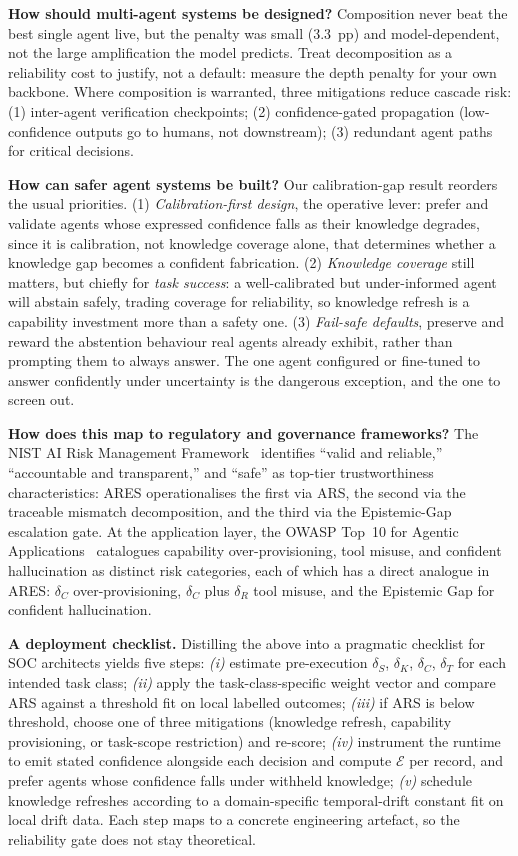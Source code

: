 \documentclass[journal,compsoc]{IEEEtran}
\newcommand{\ARES}{\textsc{ARES}}
\begin{document}
\textbf{How should multi-agent systems be designed?}
Composition never beat the best single agent live, but the penalty was
small ($3.3$~pp) and model-dependent, not the large amplification the
model predicts. Treat decomposition as a reliability cost to justify,
not a default: measure the depth penalty for your own backbone. Where
composition is warranted, three mitigations reduce cascade risk: (1)
inter-agent verification checkpoints; (2) confidence-gated propagation
(low-confidence outputs go to humans, not downstream); (3) redundant
agent paths for critical decisions.

\textbf{How can safer agent systems be built?}
Our calibration-gap result reorders the usual priorities. (1)
\textit{Calibration-first design}, the operative lever: prefer and
validate agents whose expressed confidence falls as their knowledge
degrades, since it is calibration, not knowledge coverage alone, that
determines whether a knowledge gap becomes a confident fabrication.
(2) \textit{Knowledge coverage} still matters, but chiefly for
\textit{task success}: a well-calibrated but under-informed agent will
abstain safely, trading coverage for reliability, so knowledge refresh
is a capability investment more than a safety one. (3) \textit{Fail-safe
defaults}, preserve and reward the abstention behaviour real agents
already exhibit, rather than prompting them to always answer. The one
agent configured or fine-tuned to answer confidently under uncertainty
is the dangerous exception, and the one to screen out.

\textbf{How does this map to regulatory and governance frameworks?}
The NIST AI Risk Management
Framework~\cite{nist_ai_rmf} identifies ``valid and reliable,''
``accountable and transparent,'' and ``safe'' as top-tier
trustworthiness characteristics: \ARES{} operationalises the first
via ARS, the second via the traceable mismatch decomposition, and
the third via the Epistemic-Gap escalation gate. At the application layer,
the OWASP Top~10 for Agentic
Applications~\cite{owasp2026agentic} catalogues capability
over-provisioning, tool misuse, and confident hallucination as
distinct risk categories, each of which has a direct analogue in
\ARES{}: $\delta_C$ over-provisioning, $\delta_C$ plus $\delta_R$
tool misuse, and the Epistemic Gap for confident hallucination.

\textbf{A deployment checklist.}
Distilling the above into a pragmatic checklist for SOC
architects yields five steps: \textit{(i)} estimate pre-execution
$\delta_S$, $\delta_K$, $\delta_C$, $\delta_T$ for each intended
task class; \textit{(ii)} apply the task-class-specific weight
vector and compare ARS against a threshold fit on local labelled
outcomes; \textit{(iii)}
if ARS is below threshold, choose one of three mitigations
(knowledge refresh, capability provisioning, or task-scope
restriction) and re-score; \textit{(iv)} instrument the runtime
to emit stated confidence alongside each decision and compute
$\mathcal{E}$ per record, and prefer agents whose confidence
falls under withheld knowledge; \textit{(v)} schedule knowledge
refreshes according to a domain-specific temporal-drift
constant fit on local drift data. Each step maps to a concrete
engineering artefact, so the reliability gate does not stay
theoretical.
\end{document}
